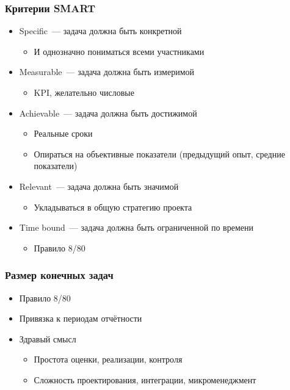 \documentclass{../../slides-style}
\begin{document}
    \begin{frame}
        \frametitle{Критерии SMART}
        \begin{itemize}
            \item Specific~--- задача должна быть конкретной
            \begin{itemize}
                \item И однозначно пониматься всеми участниками
            \end{itemize}
            \item Measurable~--- задача должна быть измеримой
            \begin{itemize}
                \item KPI, желательно числовые
            \end{itemize}
            \item Achievable~--- задача должна быть достижимой 
            \begin{itemize}
                \item Реальные сроки
                \item Опираться на объективные показатели (предыдущий опыт, средние показатели)
            \end{itemize}
            \item Relevant~--- задача должна быть значимой
            \begin{itemize}
                \item Укладываться в общую стратегию проекта
            \end{itemize}
            \item Time bound~--- задача должна быть ограниченной по времени
            \begin{itemize}
                \item Правило 8/80
            \end{itemize}
        \end{itemize}
    \end{frame}

    \begin{frame}
        \frametitle{Размер конечных задач}
        \begin{itemize}
            \item Правило 8/80
            \item Привязка к периодам отчётности
            \item Здравый смысл
            \begin{itemize}
                \item Простота оценки, реализации, контроля
                \item Сложность проектирования, интеграции, микроменеджмент
            \end{itemize} 
        \end{itemize}
    \end{frame}
\end{document}
